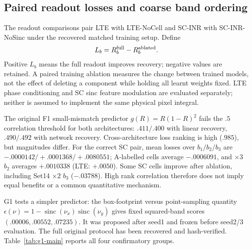 \subsection{Paired readout losses and coarse band ordering}\label{sec:readout-main}
The readout comparisons pair LTE with LTE-NoCell and SC-INR with SC-INR-NoSinc under the recovered matched training setup. Define
\begin{equation}\label{eq:loss}
L_b=R_b^{\rm full}-R_b^{\rm ablated}.
\end{equation}
Positive $L_b$ means the full readout improves recovery; negative values are retained. A paired training ablation measures the change between trained models, not the effect of deleting a component while holding all learnt weights fixed. LTE phase conditioning and SC sinc feature modulation are evaluated separately; neither is assumed to implement the same physical pixel integral.

The original F1 small-mismatch predictor $g(R)=R(1-R)^2$ fails the $.5$ correlation threshold for both architectures: $.411/.400$ with linear recovery, $.490/.492$ with network recovery. Cross-architecture loss ranking is high ($.985$), but magnitudes differ. For the correct SC pair, mean losses over $b_1/b_2/b_3$ are $-.0000142/+.0001368/+.0080551$; A-labelled cells average $-.0006091$, and $\times3$ $b_2$ averages $+.0010338$ (LTE: $+.0050$). Some SC cells improve after ablation, including Set14 $\times2$ $b_3$ ($-.03788$). High rank correlation therefore does not imply equal benefits or a common quantitative mechanism.

G1 tests a simpler predictor: the box-footprint versus point-sampling quantity $\epsilon(\nu)=1-\operatorname{sinc}(\nu_x)\operatorname{sinc}(\nu_y)$ gives fixed squared-band scores $(.00006,.00552,.07235)$. It was proposed after seed1 and frozen before seed2/3 evaluation. The full original protocol has been recovered and hash-verified. Table~\ref{tab:g1-main} reports all four confirmatory groups.

